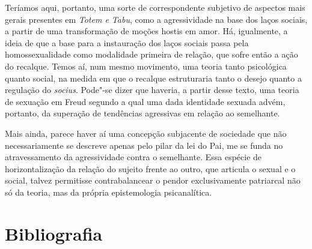 Teríamos aqui, portanto, uma sorte de correspondente subjetivo de
aspectos mais gerais presentes em \emph{Totem e Tabu}, como a agressividade
na base dos laços sociais, a partir de uma transformação de moções
hostis em amor. Há, igualmente, a ideia de que a base para a instauração
dos laços sociais passa pela homossexualidade como modalidade primeira
de relação, que sofre então a ação do recalque. Temos aí, num mesmo
movimento, uma teoria tanto psicológica quanto social, na medida em que
o recalque estruturaria tanto o desejo quanto a regulação do
\emph{socius}. Pode"-se dizer que haveria, a partir desse texto, uma
teoria de sexuação em Freud segundo a qual uma dada identidade sexuada
advém, portanto, da superação de tendências agressivas em relação ao
semelhante.

Mais ainda, parece haver aí uma concepção subjacente de sociedade que
não necessariamente se descreve apenas pelo pilar da lei do Pai, me se
funda no atravessamento da agressividade contra o semelhante. Essa
espécie de horizontalização da relação do sujeito frente ao outro, que
articula o sexual e o social, talvez permitisse contrabalancear o pendor
exclusivamente patriarcal não só da teoria, mas da própria epistemologia
psicanalítica.

\section{Bibliografia}

